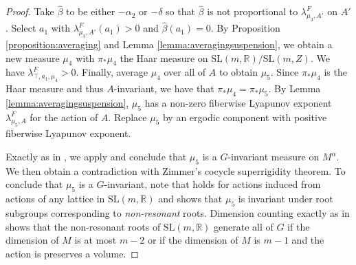 \documentclass[10pt,reqno]{amsart}
\theoremstyle{Theorem}
\theoremstyle{definition}
\theoremstyle{remark}
\newcommand{\R}{\mathbb {R}}
\newcommand{\Sl}{\mathrm{SL}}
\begin{document}
\begin{proof}
Take $\hat \beta$ to be either $-\alpha_2$ or  $-\delta$ so that $\hat \beta$ is not proportional to $\lambda_{\mu_3,A'}^F$ on $A'$.
Select $a_1$ with $\lambda_{\mu_3,A'}^F(a_1)>0$ and  $\hat \beta(a_1)=0$.  By Proposition \ref{proposition:averaging} and Lemma \ref{lemma:averagingsuspension}, we obtain a new measure $\mu_4$ with  $\pi_*\mu_4$ the Haar measure on $\Sl(m, \R)/\Sl(m,Z)$.  We have $ \lambda_{\top, a_1,\mu_4}^F >0$.
Finally, average $\mu_4$ over all of $A$ to obtain $\mu_5$.  Since $\pi_*\mu_4$ is the Haar measure and thus   $A$-invariant, we have that $\pi_*\mu_4= \pi_*\mu_5$.
By Lemma \ref{lemma:averagingsuspension},      $\mu_5$ has a non-zero fiberwise Lyapunov exponent $\lambda_{\mu_5,A}^F$ for the action of $A$.  Replace  $\mu_5$ by an ergodic component with positive fiberwise Lyapunov exponent.

Exactly as in \cite[Section 5.5]{BFH}, we apply \cite[Proposition 5.1]{AWBFRHZW-latticemeasure} and conclude that  $\mu_5$ is a $G$-invariant measure on $M^{\alpha}$.  We then obtain a contradiction with  Zimmer's cocycle superrigidity theorem.
To conclude that $\mu_5$ is a $G$-invariant, note that \cite[Proposition 5.1]{AWBFRHZW-latticemeasure} holds for actions induced from actions of any lattice in $\Sl(m,\R)$ and shows that   $\mu_5$ is invariant under   root subgroups corresponding to \emph{non-resonant} roots.   Dimension counting exactly as in   \cite[Section 5.5]{BFH}  shows that the  non-resonant roots of $\Sl(m,\R)$  generate all of $G$ if  the  dimension of $M$ is at most $m-2$ or if the dimension of $M$ is $m-1$ and  the action is  preserves a  volume.
\end{proof}
\end{document}
